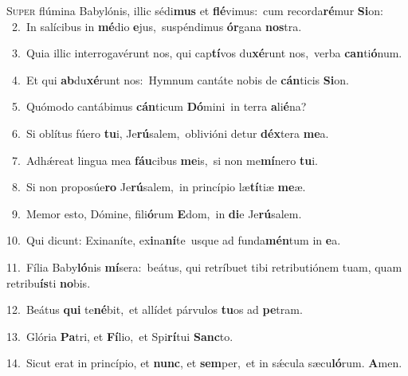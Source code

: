 \lettrine{\initial\textcolor{\initialcolor}{S}}{uper} flúmina Babylónis, illic sédi\textbf{mus} et \textbf{flé}\-vimus:~\star cum recorda\-\textbf{ré}\-mur \textbf{Si}\-on:\\
{\numbfont\textcolor{\numbcolor}{~2.}}~In salícibus in \textbf{mé}\-dio \textbf{e}\-jus,~\star suspéndimus \textbf{ór}\-gana \textbf{nos}\-tra.\par
{\numbfont\textcolor{\numbcolor}{~3.}}~Quia illic interrogavérunt nos, qui cap\-\textbf{tí}\-vos du\-\textbf{xé}\-runt nos,~\star verba \textbf{can}\-ti\-\textbf{ó}\-num.\par
{\numbfont\textcolor{\numbcolor}{~4.}}~Et qui \textbf{ab}\-du\-\textbf{xé}\-runt nos:~\star Hymnum cantáte nobis de \textbf{cán}\-ticis \textbf{Si}\-on.\par
{\numbfont\textcolor{\numbcolor}{~5.}}~Quómodo cantábimus \textbf{cán}\-ticum \textbf{Dó}\-mini~\star in terra \textbf{a}\-li\-\textbf{é}\-na?\par
{\numbfont\textcolor{\numbcolor}{~6.}}~Si oblítus fúero \textbf{tu}\-i, Je\-\textbf{rú}\-salem,~\star oblivióni detur \textbf{déx}\-tera \textbf{me}\-a.\par
{\numbfont\textcolor{\numbcolor}{~7.}}~Adhǽreat lingua mea \textbf{fáu}\-cibus \textbf{me}\-is,~\star si non me\-\textbf{mí}\-nero \textbf{tu}\-i.\par
{\numbfont\textcolor{\numbcolor}{~8.}}~Si non proposúe\textbf{ro} Je\-\textbf{rú}\-salem,~\star in princípio læ\-\textbf{tí}\-tiæ \textbf{me}\-æ.\par
{\numbfont\textcolor{\numbcolor}{~9.}}~Memor esto, Dómine, fili\-\textbf{ó}\-rum \textbf{E}\-dom,~\star in \textbf{di}\-e Je\-\textbf{rú}\-salem.\par
{\numbfont\textcolor{\numbcolor}{10.}}~Qui dicunt: Exinaníte, ex\-\textbf{i}\-na\-\textbf{ní}\-te~\star usque ad funda\-\textbf{mén}\-tum in \textbf{e}\-a.\par
{\numbfont\textcolor{\numbcolor}{11.}}~Fília Baby\-\textbf{ló}\-nis \textbf{mí}\-sera:~\star beátus, qui retríbuet tibi retributiónem tuam, quam retribu\-\textbf{ís}\-ti \textbf{no}\-bis.\par
{\numbfont\textcolor{\numbcolor}{12.}}~Beátus \textbf{qui} te\-\textbf{né}\-bit,~\star et allídet párvulos \textbf{tu}\-os ad \textbf{pe}\-tram.\par
{\numbfont\textcolor{\numbcolor}{13.}}~Glória \textbf{Pa}\-tri, et \textbf{Fí}\-lio,~\star et Spi\-\textbf{rí}\-tui \textbf{Sanc}\-to.\par
{\numbfont\textcolor{\numbcolor}{14.}}~Sicut erat in princípio, et \textbf{nunc}\-, et \textbf{sem}\-per,~\star et in sǽcula sæcu\-\textbf{ló}\-rum. \textbf{A}\-men.\par
